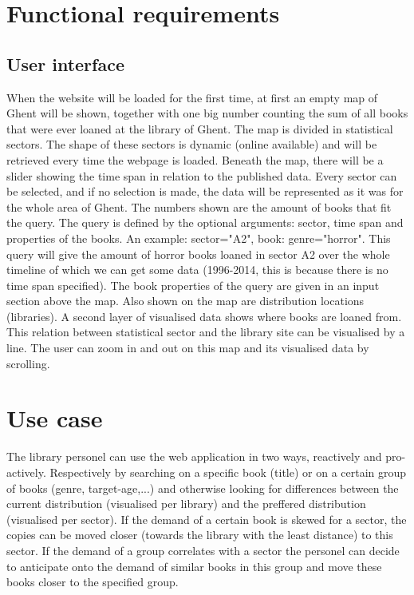 \section{Functional requirements}

\subsection{User interface}

When the website will be loaded for the first time, at first an empty map of Ghent will be shown, together with one big number counting the sum of all books that were ever loaned at the library of Ghent. The map is divided in statistical sectors. The shape of these sectors is dynamic (online available) and will be retrieved every time the webpage is loaded. Beneath the map, there will be a slider showing the time span in relation to the published data. Every sector can be selected, and if no selection is made, the data will be represented as it was for the whole area of Ghent.  The numbers shown are the amount of books that fit the query. The query is defined by the optional arguments: sector, time span and properties of the books. An example: sector="A2", book: genre="horror". This query will give the amount of horror books loaned in sector A2 over the whole timeline of which we can get some data (1996-2014, this is because there is no time span specified). The book properties of the query are given in an input section above the map. Also shown on the map are distribution locations (libraries). A second layer of visualised data shows where books are loaned from. This relation between statistical sector and the library site can be visualised by a line. The user can zoom in and out on this map and its visualised data by scrolling.

\section{Use case}

The library personel can use the web application in two ways, reactively and pro-actively. Respectively by searching on a specific book (title) or on a certain group of books (genre, target-age,...) and otherwise looking for differences between the current distribution (visualised per library) and the preffered distribution (visualised per sector). If the demand of a certain book is skewed for a sector, the copies can be moved closer (towards the library with the least distance) to this sector. If the demand of a group correlates with a sector the personel can decide to anticipate onto the demand of similar books in this group and move these books closer to the specified group.
